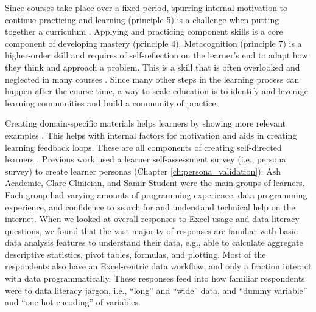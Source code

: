 \documentclass[030-workshop.tex]{subfiles}
\begin{document}
    Since courses take place over a fixed period,
    spurring internal motivation to continue practicing and learning (principle 5) is a challenge when putting together a curriculum
    \cite{ambrose2010learning}.
    Applying and practicing component skills is a core component of developing mastery (principle 4).
    Metacognition (principle 7) is a higher-order skill and requires of self-reflection on the learner's end
    to adapt how they think and approach a problem.
    This is a skill that is often overlooked and neglected in many courses
    \cite{ambrose2010learning}.
    Since many other steps in the learning process can happen after the course time,
    a way to scale education is to identify and leverage learning communities
    and build a community of practice. %

    Creating domain-specific materials helps learners by showing more relevant examples
    \cite{ambrose2010learning, Koch2016, wilson2019teaching, krossDemocratizationDataScience2020}.
    This helps with internal factors for motivation and aids in creating learning feedback loops.
    These are all components of creating self-directed learners
    \cite{ambrose2010learning, Koch2016, wilson2019teaching, krossDemocratizationDataScience2020}.
    Previous work used a learner self-assessment survey (i.e., persona survey) to create learner personas
    (Chapter \ref{ch:persona_validation}):
    Ash Academic, Clare Clinician, and Samir Student were the main groups of learners.
    Each group had varying amounts of
    programming experience, data programming experience, and
    confidence to search for and understand technical help on the internet.
    When we looked at overall responses to Excel usage and data literacy questions,
    we found that the vast majority of responses are familiar with basic data analysis features to understand their data,
    e.g., able to calculate aggregate descriptive statistics,
    pivot tables,
    formulas,
    and plotting. %
    Most of the respondents also have an Excel-centric data workflow,
    and only a fraction interact with data programmatically. %
    These responses feed into how familiar respondents were to data literacy jargon, i.e., ``long'' and ``wide'' data,
    and ``dummy variable'' and ``one-hot encoding'' of variables.
\end{document}
